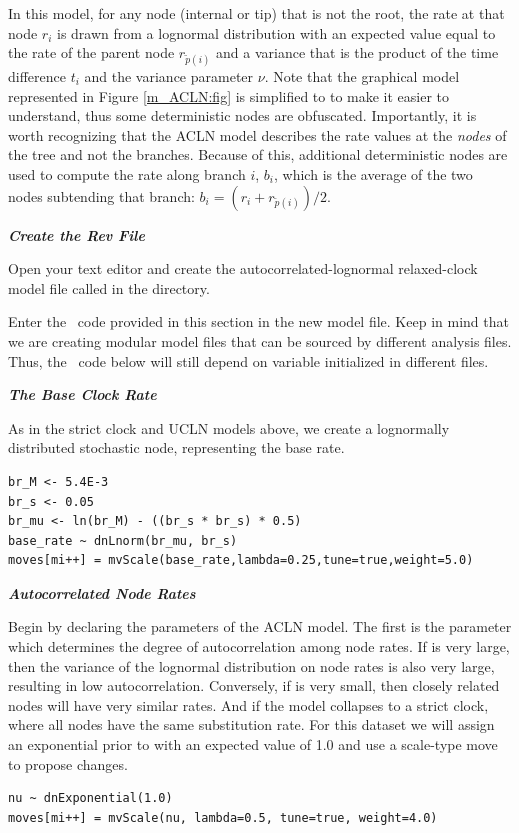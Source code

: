 In this model, for any node (internal or tip) that is not the root, the rate at that node $r_i$ is drawn from a lognormal distribution with an expected value equal to the rate of the parent node $r_{\tilde{p}(i)}$ and a variance that is the product of the time difference $t_i$ and the variance parameter $\nu$. 
Note that the graphical model represented in Figure \ref{m_ACLN:fig} is simplified to to make it easier to understand, thus some deterministic nodes are obfuscated.  
Importantly, it is worth recognizing that the ACLN model describes the rate values at the \textit{nodes} of the tree and not the branches. 
Because of this, additional deterministic nodes are used to compute the rate along branch $i$, $b_i$, which is the average of the two nodes subtending that branch: $b_i = (r_i + r_{\tilde{p}(i)}) / 2$.

\textbf{\textit{Create the Rev File}}

{\begin{framed}
Open your text editor and create the autocorrelated-lognormal relaxed-clock model file called {\textcolor{red}{}} in the  directory.

Enter the \Rev~code provided in this section in the new model file. Keep in mind that we are creating modular model files that can be sourced by different analysis files. Thus, the \Rev~code below will still depend on variable initialized in different files.
\end{framed}}



\textbf{\textit{The Base Clock Rate}}

As in the strict clock and UCLN models above, we create a lognormally distributed stochastic node, representing the base rate.
{\tt \begin{snugshade*}
\begin{lstlisting}
br_M <- 5.4E-3
br_s <- 0.05
br_mu <- ln(br_M) - ((br_s * br_s) * 0.5)
base_rate ~ dnLnorm(br_mu, br_s)
moves[mi++] = mvScale(base_rate,lambda=0.25,tune=true,weight=5.0)
\end{lstlisting}
\end{snugshade*}}


\textbf{\textit{Autocorrelated Node Rates}}

Begin by declaring the parameters of the ACLN model. The first is the parameter  which determines the degree of autocorrelation among node rates. If  is very large, then the variance of the lognormal distribution on node rates is also very large, resulting in low autocorrelation. 
Conversely, if  is very small, then closely related nodes will have very similar rates.
And if  the model collapses to a strict clock, where all nodes have the same substitution rate.
For this dataset we will assign an exponential prior to  with an expected value of 1.0 and use a scale-type move to propose changes.
{\tt \begin{snugshade*}
\begin{lstlisting}
nu ~ dnExponential(1.0)
moves[mi++] = mvScale(nu, lambda=0.5, tune=true, weight=4.0)
\end{lstlisting}
\end{snugshade*}}

